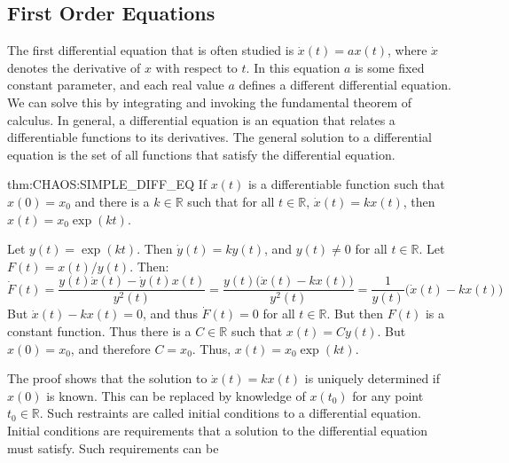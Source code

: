 \documentclass[crop=false,class=book,oneside]{standalone}
\begin{document}
        \subsection{First Order Equations}
        The first differential equation that is often studied
        is $\dot{x}(t)=ax(t)$, where $\dot{x}$ denotes the
        derivative of $x$ with respect to $t$. In this equation
        $a$ is some fixed constant parameter, and each real
        value $a$ defines a different differential equation.
        We can solve this by integrating and invoking the
        fundamental theorem of calculus. In general, a
        differential equation is an equation that relates
        a differentiable functions to its derivatives.
        The general solution to a differential equation is
        the set of all functions that satisfy the
        differential equation.
        \begin{ftheorem}{}{thm:CHAOS:SIMPLE_DIFF_EQ}
            If $x(t)$ is a differentiable function such
            that $x(0)=x_{0}$ and there is a $k\in\mathbb{R}$
            such that for all $t\in\mathbb{R}$, $\dot{x}(t)=kx(t)$,
            then $x(t)=x_{0}\exp(kt)$.
        \end{ftheorem}
        \begin{bproof}
            Let $y(t)=\exp(kt)$. Then $\dot{y}(t)=ky(t)$,
            and $y(t)\ne{0}$ for all $t\in\mathbb{R}$.
            Let $F(t)=x(t)/y(t)$. Then:
            \begin{equation*}
                \dot{F}(t)=
                \frac{y(t)\dot{x}(t)-\dot{y}(t)x(t)}{y^{2}(t)}
                =\frac{y(t)\big(\dot{x}(t)-kx(t)\big)}{y^{2}(t)}
                =\frac{1}{y(t)}\big(\dot{x}(t)-kx(t)\big)
            \end{equation*}
            But $\dot{x}(t)-kx(t)=0$, and thus $\dot{F}(t)=0$ for
            all $t\in\mathbb{R}$. But then $F(t)$ is a constant
            function. Thus there is a $C\in\mathbb{R}$ such
            that $x(t)=Cy(t)$. But $x(0)=x_{0}$, and therefore
            $C=x_{0}$. Thus, $x(t)=x_{0}\exp(kt)$.
        \end{bproof}
        The proof shows that the solution to $\dot{x}(t)=kx(t)$
        is uniquely determined if $x(0)$ is known. This can
        be replaced by knowledge of $x(t_{0})$ for any point
        $t_{0}\in\mathbb{R}$.
        Such restraints are called initial conditions to a
        differential equation. Initial conditions are
        requirements that a solution to the differential
        equation must satisfy. Such requirements can be
\end{document}

